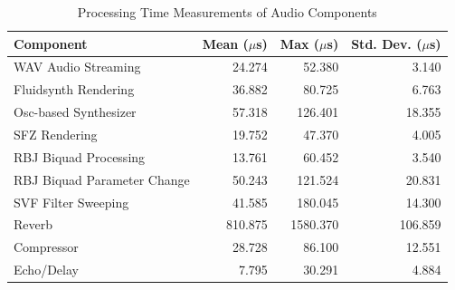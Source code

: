 \begin{table}[htbp]
    \centering
    \caption{Processing Time Measurements of Audio Components}
    \label{tab:audio_component_benchmark}
    \begin{tabular}{lrrr}
        \toprule
        \textbf{Component} & 
        \textbf{Mean ($\mu$s)} & 
        \textbf{Max ($\mu$s)} & 
        \textbf{Std. Dev. ($\mu$s)} \\
        \midrule
        WAV Audio Streaming & 24.274 & 52.380 & 3.140 \\
        Fluidsynth Rendering & 36.882 & 80.725 & 6.763 \\
        Osc-based Synthesizer & 57.318 & 126.401 & 18.355 \\
        SFZ Rendering & 19.752 & 47.370 & 4.005 \\
        RBJ Biquad Processing & 13.761 & 60.452 & 3.540 \\
        RBJ Biquad Parameter Change & 50.243 & 121.524 & 20.831 \\
        SVF Filter Sweeping & 41.585 & 180.045 & 14.300 \\
        Reverb & 810.875 & 1580.370 & 106.859 \\
        Compressor & 28.728 & 86.100 & 12.551 \\
        Echo/Delay & 7.795 & 30.291 & 4.884 \\
        \bottomrule
    \end{tabular}
\end{table}